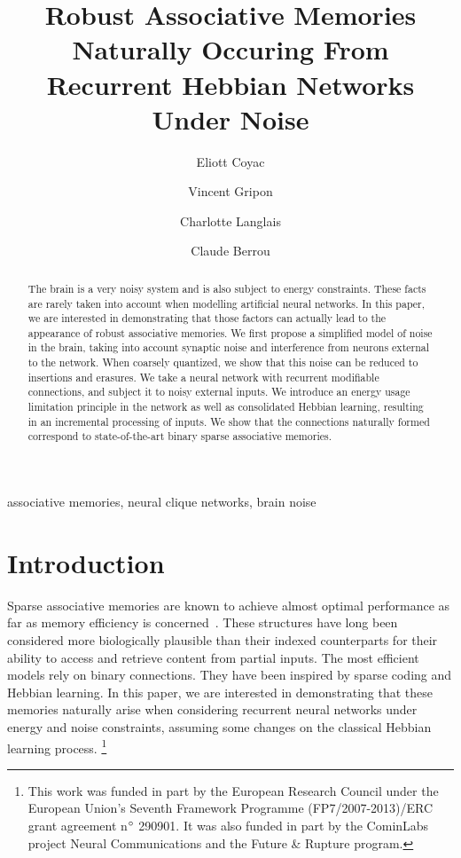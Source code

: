 \documentclass[journal]{IEEEtran}
\newcommand\blfootnote[1]{%
  \begingroup
  \renewcommand\thefootnote{}\footnote{#1}%
  \addtocounter{footnote}{-1}%
  \endgroup
}
\begin{document}
\author{Eliott Coyac}
\author{Vincent Gripon}
\author{Charlotte Langlais}
\author{Claude Berrou}


\title{Robust Associative Memories Naturally Occuring From Recurrent Hebbian Networks Under Noise}

\maketitle

\begin{abstract}

  The brain is a very noisy system and is also subject to energy constraints. These facts are rarely taken into account when modelling artificial neural networks. In this paper, we are interested in demonstrating that those factors can actually lead to the appearance of robust associative memories. We first propose a simplified model of noise in the brain, taking into account synaptic noise and interference from neurons external to the network. When coarsely quantized, we show that this noise can be reduced to insertions and erasures. %
We take a neural network with recurrent modifiable connections, and subject it to noisy external inputs. We introduce an energy usage limitation principle in the network as well as consolidated Hebbian learning, resulting in an incremental processing of inputs. We show that the connections naturally formed correspond to state-of-the-art binary sparse associative memories.

\end{abstract}

\begin{IEEEkeywords}
  associative memories, neural clique networks, brain noise
\end{IEEEkeywords}

\section{Introduction}

Sparse associative memories are known to achieve almost optimal performance as far as memory efficiency is concerned~\cite{gripon2015comparative}. These structures have long been considered more biologically plausible than their indexed counterparts for their ability to access and retrieve content from partial inputs. The most efficient models rely on binary connections\cite{}. They have been inspired by sparse coding and Hebbian learning. In this paper, we are interested in demonstrating that these memories naturally arise when considering recurrent neural networks under energy and noise constraints, assuming some changes on the classical Hebbian learning process.
\blfootnote{This work was funded in part by the European Research Council under the European Union's Seventh Framework Programme (FP7/2007-2013)/ERC grant agreement n$\degree$ 290901. It was also funded in part by the CominLabs project Neural Communications and the Future \& Rupture program.}
\end{document}
